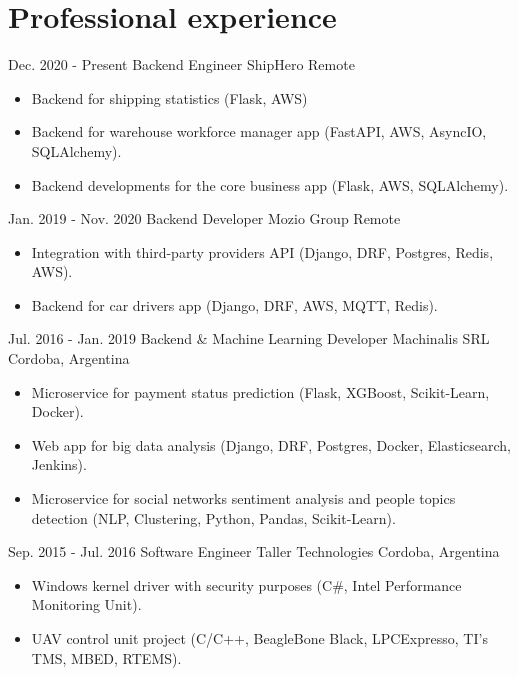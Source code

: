 
\section{Professional experience}
  \cventry
    {Dec. 2020 - Present} %
    {Backend Engineer} %
    {ShipHero} %
    {Remote} %
    {}
    {
      \begin{itemize} %
        \item {Backend for shipping statistics (Flask, AWS)}
        \item {Backend for warehouse workforce manager app (FastAPI, AWS, AsyncIO, SQLAlchemy).}
        \item {Backend developments for the core business app (Flask, AWS, SQLAlchemy).}
      \end{itemize}
    }
  \cventry
    {Jan. 2019 - Nov. 2020} %
    {Backend Developer} %
    {Mozio Group} %
    {Remote} %
    {}
    {
      \begin{itemize} %
        \item {Integration with third-party providers API (Django, DRF, Postgres, Redis, AWS).}
        \item {Backend for car drivers app (Django, DRF, AWS, MQTT, Redis).}
      \end{itemize}
    }

  \cventry
    {Jul. 2016 - Jan. 2019} %
    {Backend \& Machine Learning Developer} %
    {Machinalis SRL} %
    {Cordoba, Argentina} %
    {}
    {
      \begin{itemize} %
        \item {Microservice for payment status prediction (Flask, XGBoost, Scikit-Learn, Docker).}
        \item {Web app for big data analysis (Django, DRF, Postgres, Docker, Elasticsearch, Jenkins).}
        \item {Microservice for social networks sentiment analysis and people topics detection (NLP, Clustering, Python, Pandas, Scikit-Learn).}
      \end{itemize}
    }

  \cventry
    {Sep. 2015 - Jul. 2016} %
    {Software Engineer} %
    {Taller Technologies} %
    {Cordoba, Argentina} %
    {}
    {
      \begin{itemize} %
        \item {Windows kernel driver with security purposes (C\#, Intel Performance Monitoring Unit).}
        \item {UAV control unit project (C/C++, BeagleBone Black, LPCExpresso, TI's TMS, MBED, RTEMS).}
      \end{itemize}
    }

